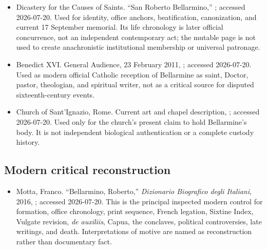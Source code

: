 \begin{itemize}
\item Dicastery for the Causes of Saints.  ``San Roberto Bellarmino,''
; accessed 2026-07-20.  Used for identity, office anchors, beatification,
canonization, and current 17 September memorial.  Its life chronology is later
official concurrence, not an independent contemporary act; the mutable page is
not used to create anachronistic institutional membership or universal
patronage.

\item Benedict XVI.  General Audience, 23 February 2011,
; accessed 2026-07-20.  Used as modern official Catholic reception
of Bellarmine as saint, Doctor, pastor, theologian, and spiritual writer, not
as a critical source for disputed sixteenth-century events.

\item Church of Sant'Ignazio, Rome.  Current art and chapel description,
; accessed 2026-07-20.  Used only for the church's present claim to hold
Bellarmine's body.  It is not independent biological authentication or a
complete custody history.
\end{itemize}

\subsection{Modern critical reconstruction}

\begin{itemize}
\item Motta, Franco.  ``Bellarmino, Roberto,'' \emph{Dizionario Biografico
degli Italiani}, 2016,
; accessed 2026-07-20.  This is the principal inspected modern control
for formation, office chronology, print sequence, French legation, Sixtine
Index, Vulgate revision, \emph{de auxiliis}, Capua, the conclaves, political
controversies, late writings, and death.  Interpretations of motive are named
as reconstruction rather than documentary fact.

\end{itemize}

\endgroup
